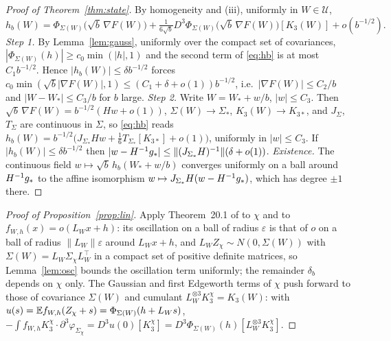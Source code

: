 \begin{proof}[Proof of Theorem~\ref{thm:state}]
By homogeneity and (iii), uniformly in $W\in\mathcal U$,
\begin{equation}\label{eq:hb}
h_b(W)=\Phi_{\Sigma(W)}\big(\sqrt b\,\nabla F(W)\big)+\tfrac1{6\sqrt b}D^3\Phi_{\Sigma(W)}\big(\sqrt b\,\nabla F(W)\big)[K_3(W)]+o(b^{-1/2}).
\end{equation}
\emph{Step 1.} By Lemma~\ref{lem:gauss}, uniformly over the compact set of covariances,
$|\Phi_{\Sigma(W)}(h)|\ge c_0\min(|h|,1)$ and the second term of \eqref{eq:hb} is at most $C_1b^{-1/2}$. Hence
$|h_b(W)|\le\delta b^{-1/2}$ forces $c_0\min(\sqrt b|\nabla F(W)|,1)\le(C_1+\delta+o(1))b^{-1/2}$, i.e.\
$|\nabla F(W)|\le C_2/b$ and $|W-W_\ast|\le C_3/b$ for $b$ large. \emph{Step 2.} Write $W=W_\ast+w/b$, $|w|\le C_3$. Then
$\sqrt b\,\nabla F(W)=b^{-1/2}(Hw+o(1))$, $\Sigma(W)\to\Sigma_\ast$, $K_3(W)\to K_{3\ast}$, and $J_\Sigma$, $T_\Sigma$ are
continuous in $\Sigma$, so \eqref{eq:hb} reads $h_b(W)=b^{-1/2}\big(J_{\Sigma_\ast}Hw+\frac16T_{\Sigma_\ast}[K_{3\ast}]+o(1)\big)$,
uniformly in $|w|\le C_3$. If $|h_b(W)|\le\delta b^{-1/2}$ then $|w-H^{-1}g_\ast|\le\|(J_{\Sigma_\ast}H)^{-1}\|(\delta+o(1))$.
\emph{Existence.} The continuous field $w\mapsto\sqrt b\,h_b(W_\ast+w/b)$ converges uniformly on a ball around
$H^{-1}g_\ast$ to the affine isomorphism $w\mapsto J_{\Sigma_\ast}H(w-H^{-1}g_\ast)$, which has degree $\pm1$ there.
\end{proof}

\begin{proof}[Proof of Proposition~\ref{prop:lin}]
Apply Theorem~20.1 of \citet{br} to $\chi$ and to $f_{W,h}(x)=o(L_Wx+h)$: its oscillation on a ball of radius
$\varepsilon$ is that of $o$ on a ball of radius $\|L_W\|\varepsilon$ around $L_Wx+h$, and $L_WZ_\chi\sim
N(0,\Sigma(W))$ with $\Sigma(W)=L_W\Sigma_\chi L_W^\top$ in a compact set of positive definite matrices, so
Lemma~\ref{lem:osc} bounds the oscillation term uniformly; the remainder $\delta_b$ depends on $\chi$ only. The
Gaussian and first Edgeworth terms of $\chi$ push forward to those of covariance $\Sigma(W)$ and cumulant
$L_W^{\otimes3}K_3^\chi=K_3(W)$: with $u(s)=\mathbb{E} f_{W,h}(Z_\chi+s)=\Phi_{\Sigma(W)}(h+L_Ws)$,
$-\int f_{W,h}K_3^\chi\cdot\partial^3\varphi_{\Sigma_\chi}=D^3u(0)[K_3^\chi]=D^3\Phi_{\Sigma(W)}(h)[L_W^{\otimes3}K_3^\chi]$.
\end{proof}
